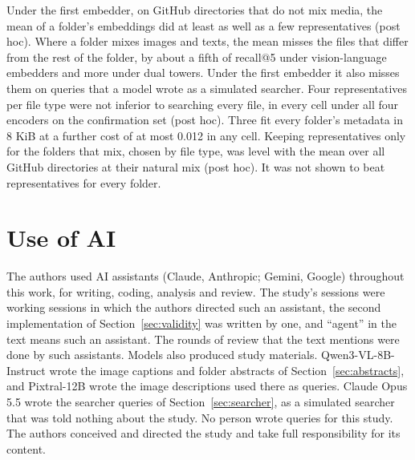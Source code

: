 \documentclass[sigconf,natbib=true,anonymous=true]{acmart}
\begin{document}
Under the first embedder, on GitHub directories that do not mix media, the mean of a folder's embeddings did at least as well as a few representatives (post hoc). Where a folder mixes images and texts, the mean misses the files that differ from the rest of the folder, by about a fifth of recall@5 under vision-language embedders and more under dual towers. Under the first embedder it also misses them on queries that a model wrote as a simulated searcher. Four representatives per file type were not inferior to searching every file, in every cell under all four encoders on the confirmation set (post hoc). Three fit every folder's metadata in 8 KiB at a further cost of at most 0.012 in any cell. Keeping representatives only for the folders that mix, chosen by file type, was level with the mean over all GitHub directories at their natural mix (post hoc). It was not shown to beat representatives for every folder.

\section*{Use of AI}

The authors used AI assistants (Claude, Anthropic; Gemini, Google) throughout this work, for writing, coding, analysis and review. The study's sessions were working sessions in which the authors directed such an assistant, the second implementation of Section~\ref{sec:validity} was written by one, and ``agent'' in the text means such an assistant. The rounds of review that the text mentions were done by such assistants. Models also produced study materials. Qwen3-VL-8B-Instruct wrote the image captions and folder abstracts of Section~\ref{sec:abstracts}, and Pixtral-12B wrote the image descriptions used there as queries. Claude Opus 5.5 wrote the searcher queries of Section~\ref{sec:searcher}, as a simulated searcher that was told nothing about the study. No person wrote queries for this study. The authors conceived and directed the study and take full responsibility for its content.



\end{document}
